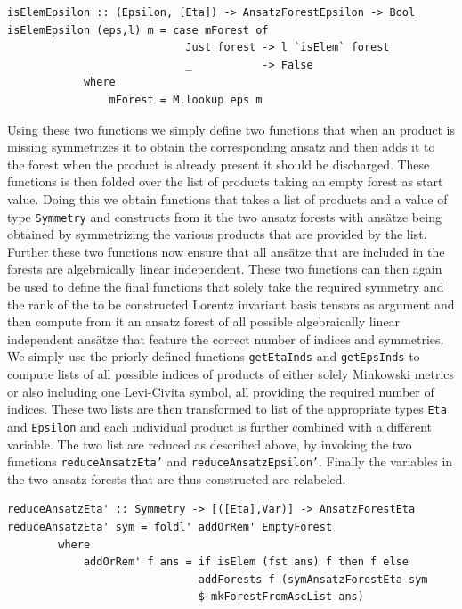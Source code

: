 \documentclass[a4paper,12pt, DIV=14, BCOR=5mm, twoside, headsepline]{scrbook}
\begin{document}
\begin{samepage}
\begin{verbatim}
isElemEpsilon :: (Epsilon, [Eta]) -> AnsatzForestEpsilon -> Bool
isElemEpsilon (eps,l) m = case mForest of
                            Just forest -> l `isElem` forest
                            _           -> False
            where
                mForest = M.lookup eps m  
\end{verbatim} 
\end{samepage}

Using these two functions we simply define two functions that when an product is missing symmetrizes it to obtain the corresponding ansatz and then adds it to the forest when the product is already present it should be discharged. These functions is then folded over the list of products taking an empty forest as start value.  Doing this we obtain functions that takes a list of products and a value of type \texttt{Symmetry} and constructs from it the two ansatz forests with ansätze being obtained by symmetrizing the various products that are provided by the list. Further these two functions now ensure that all ansätze that are included in the forests are algebraically linear independent. 
These two functions can then again be used to define the final functions that solely take the required symmetry and the rank of the to be constructed Lorentz invariant basis tensors as argument and then compute from it an ansatz forest of all possible algebraically linear independent ansätze that feature the correct number of indices and symmetries. We simply use the priorly defined functions \texttt{getEtaInds} and \texttt{getEpsInds} to compute lists of all possible indices of products of either solely Minkowski metrics or also including one Levi-Civita symbol, all providing the required number of indices. These two lists are then transformed to list of the appropriate types \texttt{Eta} and \texttt{Epsilon} and each individual product is further combined with a different variable. The two list are reduced as described above, by invoking the two functions \texttt{reduceAnsatzEta'} and \texttt{reduceAnsatzEpsilon'}. Finally the variables in the two ansatz forests that are thus constructed are relabeled.

\begin{samepage}
\begin{verbatim}
reduceAnsatzEta' :: Symmetry -> [([Eta],Var)] -> AnsatzForestEta
reduceAnsatzEta' sym = foldl' addOrRem' EmptyForest
        where
            addOrRem' f ans = if isElem (fst ans) f then f else
                              addForests f (symAnsatzForestEta sym 
                              $ mkForestFromAscList ans)
\end{verbatim} 
\end{samepage}
\end{document}

